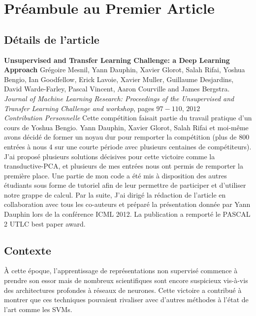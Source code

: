 \chapter{Pr\'{e}ambule au Premier Article }

\section{D\'{e}tails de l'article}

{\bf Unsupervised and Transfer Learning Challenge: a Deep Learning Approach}
Gr\'{e}goire Mesnil, Yann Dauphin, Xavier Glorot, Salah Rifai, Yoshua Bengio,
Ian Goodfellow, Erick Lavoie, Xavier Muller, Guillaume Desjardins, David
Warde-Farley, Pascal Vincent, Aaron Courville and James Bergstra. {\it Journal
of Machine Learning Research: Proceedings of the Unsupervised and Transfer
Learning Challenge and workshop}, pages $97-110$, $2012$ \\

{\it Contribution Personnelle} Cette comp\'{e}tition faisait partie du travail
pratique d'un cours de Yoshua Bengio. Yann Dauphin, Xavier Glorot, Salah Rifai
et moi-m\^{e}me avons d\'{e}cid\'{e} de former un noyau dur pour remporter la
comp\'{e}tition (plus de 800 entr\'{e}es \`{a} nous 4 sur une courte
p\'{e}riode avec plusieurs centaines de comp\'{e}titeurs).  J'ai propos\'{e}
plusieurs solutions d\'{e}cisives pour cette victoire comme la
transductive-PCA, et plusieurs de mes entr\'{e}es nous ont permis de remporter
la premi\`{e}re place. Une partie de mon code a \'{e}t\'{e} mis \`{a}
disposition des autres \'{e}tudiants sous forme de tutoriel afin de leur
permettre de participer et d'utiliser notre grappe de calcul. Par la suite,
J'ai dirig\'{e} la r\'{e}daction de l'article en collaboration avec tous les
co-auteurs et pr\'{e}par\'{e} la pr\'{e}sentation donn\'{e}e par Yann Dauphin
lors de la conf\'{e}rence ICML 2012. La publication a remport\'{e} le PASCAL 2 UTLC
best paper award. 

\section{Contexte}

\`{A} cette \'{e}poque, l'apprentissage de repr\'{e}sentations non
supervis\'{e} commence \`{a} prendre son essor mais de nombreux scientifiques
sont encore suspicieux vis-\`{a}-vis des architectures profondes à réseaux de
neurones. Cette victoire a contribu\'{e} \`{a} montrer que ces techniques
pouvaient rivaliser avec d'autres m\'{e}thodes \`{a} l'\'{e}tat de l'art comme
les SVMs.

